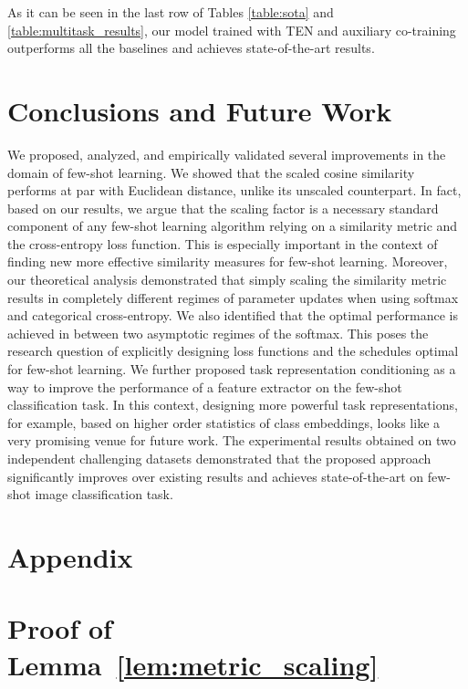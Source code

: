 \documentclass{article}
\begin{document}
As it can be seen in the last row of Tables \ref{table:sota} and \ref{table:multitask_results}, our model trained with TEN and auxiliary co-training outperforms all the baselines and achieves state-of-the-art results.




\section{Conclusions and Future Work} \label{sec:conclusions}
We proposed, analyzed, and empirically validated several improvements in the domain of few-shot learning. We showed that the scaled cosine similarity performs at par with Euclidean distance, unlike its unscaled counterpart. In fact, based on our results, we argue that the scaling factor is a necessary standard component of any few-shot learning algorithm relying on a similarity metric and the cross-entropy loss function. This is especially important in the context of finding new more effective similarity measures for few-shot learning. Moreover, our theoretical analysis demonstrated that simply scaling the similarity metric results in completely different regimes of parameter updates when using softmax and categorical cross-entropy. We also identified that the optimal performance is achieved in between two asymptotic regimes of the softmax. This poses the research question of explicitly designing loss functions and the  schedules optimal for few-shot learning. We further proposed task representation conditioning as a way to improve the performance of a feature extractor on the few-shot classification task. In this context, designing more powerful task representations, for example, based on higher order statistics of class embeddings, looks like a very promising venue for future work. The experimental results obtained on two independent challenging datasets demonstrated that the proposed approach significantly improves over existing results and achieves state-of-the-art on few-shot image classification task.  

\appendix
\section*{Appendix}

\section{Proof of Lemma~\ref{lem:metric_scaling}} \label{ssec:proof_of_metric_scaling_lemma}
\end{document}

